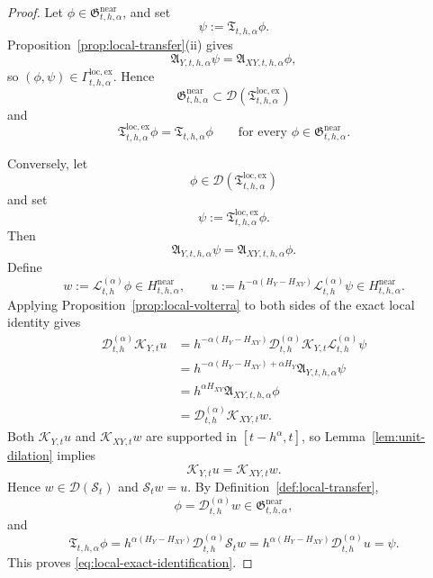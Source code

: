\documentclass[11pt,a4paper]{amsart}
\theoremstyle{plain}
\theoremstyle{definition}
\theoremstyle{remark}
\begin{document}
\begin{proof}
Let \(\phi\in\mathfrak G_{t,h,\alpha}^{\mathrm{near}}\), and set
\[
\psi:=\mathfrak T_{t,h,\alpha}\phi.
\]
Proposition~\ref{prop:local-transfer}(ii) gives
\[
\mathfrak A_{Y,t,h,\alpha}\psi
=
\mathfrak A_{XY,t,h,\alpha}\phi,
\]
so \((\phi,\psi)\in\Gamma_{t,h,\alpha}^{\mathrm{loc,ex}}\). Hence
\[
\mathfrak G_{t,h,\alpha}^{\mathrm{near}}
\subset
\mathcal D(\mathfrak T_{t,h,\alpha}^{\mathrm{loc,ex}})
\]
and
\[
\mathfrak T_{t,h,\alpha}^{\mathrm{loc,ex}}\phi
=
\mathfrak T_{t,h,\alpha}\phi
\qquad\text{for every }\phi\in\mathfrak G_{t,h,\alpha}^{\mathrm{near}}.
\]

Conversely, let
\[
\phi\in \mathcal D(\mathfrak T_{t,h,\alpha}^{\mathrm{loc,ex}})
\]
and set
\[
\psi:=\mathfrak T_{t,h,\alpha}^{\mathrm{loc,ex}}\phi.
\]
Then
\[
\mathfrak A_{Y,t,h,\alpha}\psi
=
\mathfrak A_{XY,t,h,\alpha}\phi.
\]
Define
\[
w:=\mathcal L_{t,h}^{(\alpha)}\phi\in H_{t,h,\alpha}^{\mathrm{near}},
\qquad
u:=h^{-\alpha(H_Y-H_{XY})}\mathcal L_{t,h}^{(\alpha)}\psi
\in H_{t,h,\alpha}^{\mathrm{near}}.
\]
Applying Proposition~\ref{prop:local-volterra} to both sides of the exact local identity gives
\begin{align*}
\mathcal D_{t,h}^{(\alpha)}\mathcal K_{Y,t}u
&=
h^{-\alpha(H_Y-H_{XY})}
\mathcal D_{t,h}^{(\alpha)}
\mathcal K_{Y,t}\mathcal L_{t,h}^{(\alpha)}\psi \\
&=
h^{-\alpha(H_Y-H_{XY})+\alpha H_Y}
\mathfrak A_{Y,t,h,\alpha}\psi \\
&=
h^{\alpha H_{XY}}
\mathfrak A_{XY,t,h,\alpha}\phi \\
&=
\mathcal D_{t,h}^{(\alpha)}\mathcal K_{XY,t}w.
\end{align*}
Both \(\mathcal K_{Y,t}u\) and \(\mathcal K_{XY,t}w\) are supported in \([t-h^\alpha,t]\), so
Lemma~\ref{lem:unit-dilation} implies
\[
\mathcal K_{Y,t}u=\mathcal K_{XY,t}w.
\]
Hence \(w\in\mathcal D(\mathcal S_t)\) and \(\mathcal S_t w=u\). By
Definition~\ref{def:local-transfer},
\[
\phi=\mathcal D_{t,h}^{(\alpha)}w\in \mathfrak G_{t,h,\alpha}^{\mathrm{near}},
\]
and
\[
\mathfrak T_{t,h,\alpha}\phi
=
h^{\alpha(H_Y-H_{XY})}
\mathcal D_{t,h}^{(\alpha)}\mathcal S_t w
=
h^{\alpha(H_Y-H_{XY})}
\mathcal D_{t,h}^{(\alpha)}u
=
\psi.
\]
This proves \eqref{eq:local-exact-identification}.
\end{proof}
\end{document}
